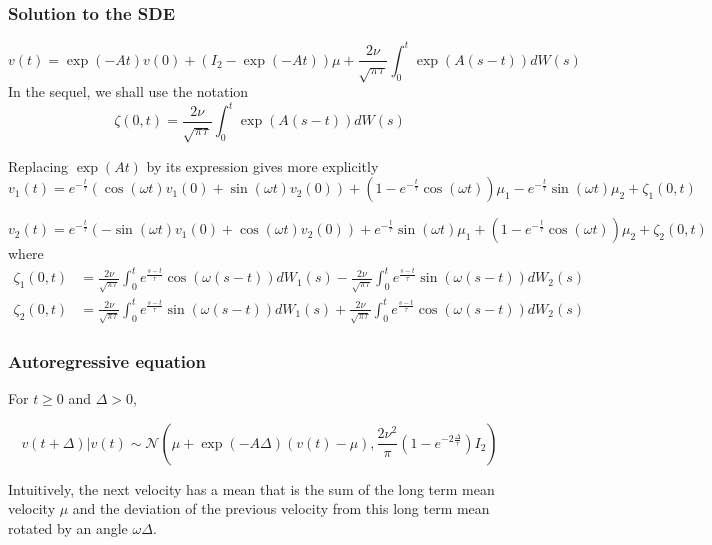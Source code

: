 \documentclass[11pt]{article}
\newcommand {\1}{\mathbb{1}}
\begin{document}
\subsubsection{Solution to the SDE}

\begin{equation}
	v(t)=\exp(-At) v(0)+ (I_2-\exp(-At))\mu +\frac{2\nu}{\sqrt{\pi \tau}}\int_{0}^{t} \exp(A(s-t)) dW(s)
	\label{eq: RACVM solution}
\end{equation}
In the sequel, we shall use the notation 
\[\zeta(0,t) =\frac{2\nu}{\sqrt{\pi \tau}}\int_{0}^{t} \exp(A(s-t)) dW(s)\] 

Replacing $\exp(At)$ by its expression gives more explicitly
\begin{equation}
	v_1(t)=e^{-\frac{t}{\tau}} \left(\cos(\omega t)v_1(0)+\sin(\omega t)v_2(0)\right)+(1-e^{-\frac{t}{\tau}}\cos(\omega t))\mu_1-e^{-\frac{t}{\tau}} \sin(\omega t) \mu_2 +\zeta_1(0,t)
	\label{eq: first random component RACVM}
\end{equation}


\begin{equation}
	v_2(t)=e^{-\frac{t}{\tau}} \left(-\sin(\omega t)v_1(0)+\cos(\omega t)v_2(0)\right)+e^{-\frac{t}{\tau}} \sin(\omega t) \mu_1+(1-e^{-\frac{t}{\tau}}\cos(\omega t))\mu_2 +\zeta_2(0,t)
	\label{eq: second random component RACVM}
\end{equation}
where \begin{align*}
	\zeta_1(0,t)&=\frac{2\nu}{\sqrt{\pi \tau}} \int_0^t e^{\frac{s-t}{\tau}} \cos(\omega(s-t)) dW_1(s) -\frac{2\nu}{\sqrt{\pi \tau}} \int_0^t e^{\frac{s-t}{\tau}} \sin(\omega(s-t)) dW_2(s) \\
	\zeta_2(0,t)&=\frac{2\nu}{\sqrt{\pi \tau}} \int_0^t e^{\frac{s-t}{\tau}} \sin(\omega(s-t)) dW_1(s) +\frac{2\nu}{\sqrt{\pi \tau}} \int_0^t e^{\frac{s-t}{\tau}} \cos(\omega(s-t)) dW_2(s)
\end{align*}
\subsubsection{Autoregressive equation}

For $t \geq 0$ and $\Delta >0$, 

\[v(t+\Delta) \vert v(t) \sim \mathcal{N}\left( \mu + \exp(-A\Delta)(v(t)-\mu), \frac{2\nu^2}{\pi}(1-e^{-2\frac{\Delta}{\tau}}) I_2 \right) \]

Intuitively, the next velocity has a mean that is the sum of the long term mean velocity $\mu$ and the deviation of the previous velocity from this long term mean rotated by an angle $\omega \Delta$.
\end{document}
